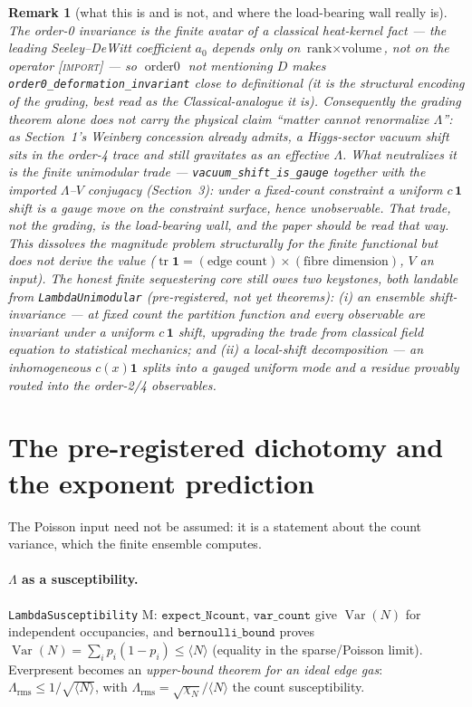 \documentclass[11pt]{article}
\newcommand{\Lam}{\Lambda}
\newcommand{\Kernel}{\textcolor{kcol}{\textsc{M}}}       %
\newcommand{\Import}{\textcolor{icol}{\textsc{[import]}}} %
\newcommand{\lm}[1]{\texttt{#1}}
\newtheorem{remark}{Remark}
\begin{document}
\begin{remark}[what this is and is not, and where the load-bearing wall really is]
The order-0 invariance is the finite avatar of a \emph{classical} heat-kernel
fact --- the leading Seeley--DeWitt coefficient $a_0$ depends only on
$\text{rank}\times\text{volume}$, not on the operator \Import{} --- so
$\operatorname{order0}$ not mentioning $D$ makes \lm{order0\_deformation\_invariant}
close to definitional (it is the structural encoding of the grading, best read as
the Classical-analogue it is).  Consequently the grading theorem \emph{alone} does
not carry the physical claim ``matter cannot renormalize $\Lam$'': as Section~1's
Weinberg concession already admits, a Higgs-sector vacuum shift sits in the
order-4 trace and still gravitates as an effective $\Lam$.  What neutralizes it is
the finite \emph{unimodular trade} --- \lm{vacuum\_shift\_is\_gauge} together with
the imported $\Lam$--$V$ conjugacy (Section~3): under a fixed-count constraint a
uniform $c\,\mathbf1$ shift is a gauge move on the constraint surface, hence
unobservable.  That trade, not the grading, is the load-bearing wall, and the
paper should be read that way.  This dissolves the magnitude problem
\emph{structurally} for the finite functional but does not derive the value
($\operatorname{tr}\mathbf1=(\text{edge count})\times(\text{fibre dimension})$,
$V$ an input).  The honest finite sequestering core still owes two keystones, both
landable from \lm{LambdaUnimodular} (\emph{pre-registered, not yet theorems}):
(i) an \emph{ensemble} shift-invariance --- at fixed count the partition function
and every observable are invariant under a uniform $c\,\mathbf1$ shift, upgrading
the trade from classical field equation to statistical mechanics; and (ii) a
\emph{local-shift decomposition} --- an inhomogeneous $c(x)\mathbf1$ splits into a
gauged uniform mode and a residue provably routed into the order-2/4 observables.
\end{remark}

\section{The pre-registered dichotomy and the exponent prediction}

The Poisson input need not be assumed: it is a statement about the count
variance, which the finite ensemble computes.

\paragraph{$\Lam$ as a susceptibility.}  \lm{LambdaSusceptibility} \Kernel:
$\lm{expect\_Ncount}$, $\lm{var\_count}$ give $\operatorname{Var}(N)$ for
independent occupancies, and $\lm{bernoulli\_bound}$ proves
$\operatorname{Var}(N)=\sum_i p_i(1-p_i)\le\langle N\rangle$ (equality in the
sparse/Poisson limit).  Everpresent becomes an \emph{upper-bound theorem for an
ideal edge gas}: $\Lam_{\mathrm{rms}}\le1/\sqrt{\langle N\rangle}$, with
$\Lam_{\mathrm{rms}}=\sqrt{\chi_N}/\langle N\rangle$ the count susceptibility.
\end{document}
